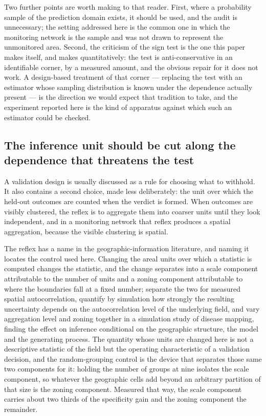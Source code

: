Two further points are worth making to that reader. First, where a probability sample of the
prediction domain exists, it should be used, and the audit is unnecessary; the setting addressed
here is the common one in which the monitoring network is the sample and was not drawn to represent
the unmonitored area. Second, the criticism of the sign test is the one this paper makes itself,
and makes quantitatively: the test is anti-conservative in an identifiable corner, by a measured
amount, and the obvious repair for it does not work. A design-based treatment of that corner ---
replacing the test with an estimator whose sampling distribution is known under the dependence
actually present --- is the direction we would expect that tradition to take, and the experiment
reported here is the kind of apparatus against which such an estimator could be checked.

\subsection{The inference unit should be cut along the dependence that threatens the test}

A validation design is usually discussed as a rule for choosing what to withhold. It also contains
a second choice, made less deliberately: the unit over which the held-out outcomes are counted when
the verdict is formed. When outcomes are visibly clustered, the reflex is to aggregate them into
coarser units until they look independent, and in a monitoring network that reflex produces a
spatial aggregation, because the visible clustering is spatial.

The reflex has a name in the geographic-information literature, and naming it locates the control
used here. Changing the areal units over which a statistic is computed changes the statistic, and
the change separates into a scale component attributable to the number of units and a zoning
component attributable to where the boundaries fall at a fixed number; \citet{zhang2019scale}
separate the two for measured spatial autocorrelation, \citet{lee2019maup} quantify by
simulation how strongly the resulting uncertainty depends on the autocorrelation level of the
underlying field, and \citet{hogg2025maup} vary aggregation level and zoning together in a
simulation study of disease mapping, finding the effect on inference conditional on the
geographic structure, the model and the generating process. The quantity whose units are changed here is not a descriptive statistic of the
field but the operating characteristic of a validation decision, and the random-grouping control is
the device that separates those same two components for it: holding the number of groups at nine
isolates the scale component, so whatever the geographic cells add beyond an arbitrary partition of
that size is the zoning component. Measured that way, the scale component carries about two thirds
of the specificity gain and the zoning component the remainder.

